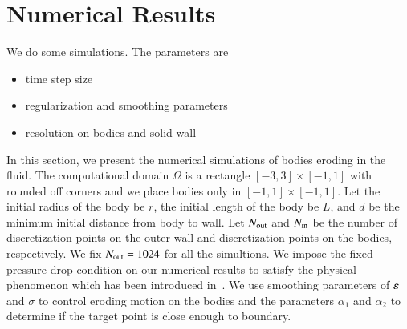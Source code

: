 \documentclass[preprint, 10pt]{elsarticle}
\begin{document}
\section{Numerical Results}
\label{s:results}
We do some simulations.  The parameters are
\begin{itemize}
  \item time step size
  \item regularization and smoothing parameters
  \item resolution on bodies and solid wall
\end{itemize}
{\color{red} In this section, we present the numerical simulations of bodies eroding in the fluid. The computational domain $\Omega$ is a rectangle $[-3,3]\times[-1,1]$ with rounded off corners and we place bodies only in $[-1,1]\times[-1,1]$. Let the initial radius of the body be $r$, the initial length of the body be $L$, 
and $d$ be the minimum initial distance from body to wall. Let $N_{\mathrm{out}}$ and $N_{\mathrm{in}}$ be the number of discretization points on the outer wall and discretization points on the bodies, respectively.  We fix $N_{\mathrm{out}}=1024$ for all the simultions. We impose the fixed pressure drop condition on our numerical results to satisfy the physical phenomenon which has been introduced in~\cite{qua-moo2018}. We use smoothing parameters of $\varepsilon$ and $\sigma$ to control eroding motion on the bodies and the parameters $\alpha_1$ and $\alpha_2$ to determine if the target point is close enough to boundary.
}
\end{document}
